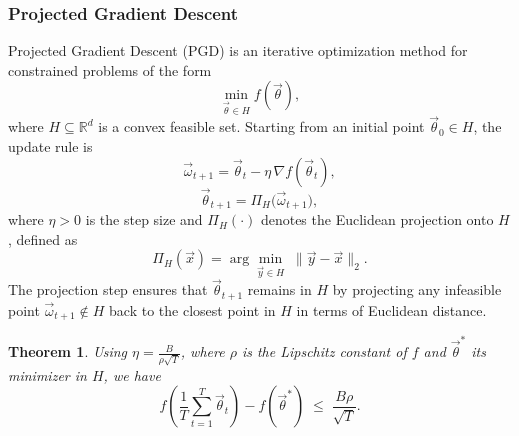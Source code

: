 \documentclass[11pt]{article}
\theoremstyle{plain}
\newtheorem{theorem}{Theorem}[section]
\begin{document}
\subsubsection{Projected Gradient Descent}
Projected Gradient Descent (PGD) is an iterative optimization method for constrained problems of the form 
\[
    \min_{\vec{\theta} \in H} f(\vec{\theta}),
\]
where $H \subseteq \mathbb{R}^d$ is a convex feasible set.  
Starting from an initial point $\vec{\theta}_0 \in H$, the update rule is
\[
    \vec{\omega}_{t+1} = \vec{\theta}_t - \eta \, \nabla f(\vec{\theta}_t),
\]
\[
    \vec{\theta}_{t+1} = \Pi_H\big(\vec{\omega}_{t+1}\big),
\]
where $\eta > 0$ is the step size and $\Pi_H(\cdot)$ denotes the Euclidean projection onto $H$, defined as
\[
    \Pi_H(\vec{x}) = \arg\min_{\vec{y} \in H} \; \lVert \vec{y} - \vec{x} \rVert_2.
\]
The projection step ensures that $\vec{\theta}_{t+1}$ remains in $H$ by projecting any infeasible point $\vec{\omega}_{t+1} \notin H$ back to the closest point in $H$ in terms of Euclidean distance.

\begin{theorem}
Using $\eta = \frac{B}{\rho \sqrt{T}}$, where $\rho$ is the Lipschitz constant of $f$ and $\vec{\theta}^*$ its minimizer in $H$, we have
\[
    f\!\left( \frac{1}{T} \sum_{t=1}^T \vec{\theta}_t \right) - f(\vec{\theta}^*) \;\le\; \frac{B\rho}{\sqrt{T}}.
\]
\end{theorem}
\end{document}
